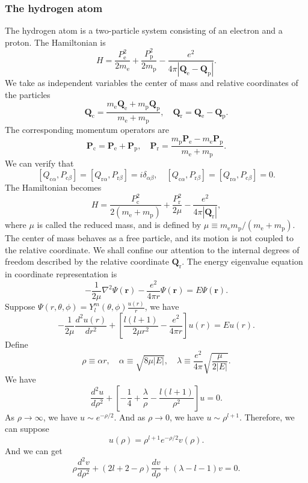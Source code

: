 \subsubsection{The hydrogen atom}
The hydrogen atom is a two-particle system consisting of an electron and a proton. The Hamiltonian is
\[H = \frac{P_{\mathrm{e}}^2}{2m_{\mathrm{e}}} + \frac{P_{\mathrm{p}}^2}{2m_{\mathrm{p}}} - \frac{e^2}{4\pi|\bm{Q}_{\mathrm{e}}-\bm{Q}_{\mathrm{p}}|}.\]
We take as independent variables the center of mass and relative coordinates of the particles
\[\bm{Q}_{\mathrm{c}} = \frac{m_{\mathrm{e}}\bm{Q}_{\mathrm{e}} + m_{\mathrm{p}}\bm{Q}_{\mathrm{p}}}{m_{\mathrm{e}}+m_{\mathrm{p}}} , \quad \bm{Q}_{\mathrm{r}} = \bm{Q}_{\mathrm{e}}-\bm{Q}_{\mathrm{p}}.\]
The corresponding momentum operators are
\[\bm{P}_{\mathrm{c}} = \bm{P}_{\mathrm{e}} + \bm{P}_{\mathrm{p}} , \quad \bm{P}_{\mathrm{r}} = \frac{m_{\mathrm{p}}\bm{P}_{\mathrm{e}}-m_{\mathrm{e}}\bm{P}_{\mathrm{p}}}{m_{\mathrm{e}} + m_{\mathrm{p}}}.\]
We can verify that
\[[Q_{\mathrm{c}\alpha},P_{\mathrm{c}\beta}] = [Q_{\mathrm{r}\alpha},P_{\mathrm{r}\beta}] = i\delta_{\alpha\beta} , \quad [Q_{\mathrm{c}\alpha},P_{\mathrm{r}\beta}] = [Q_{\mathrm{r}\alpha},P_{\mathrm{c}\beta}] = 0.\]
The Hamiltonian becomes
\[H = \frac{P_{\mathrm{c}}^2}{2(m_{\mathrm{e}}+m_{\mathrm{p}})} + \frac{P_{\mathrm{r}}^2}{2\mu} - \frac{e^2}{4\pi|\bm{Q}_{\mathrm{r}}|},\]
where $\mu$ is called the reduced mass, and is defined by $\mu \equiv {m_{\mathrm{e}}m_{\mathrm{p}}}/({m_{\mathrm{e}}+m_{\mathrm{p}}})$.
The center of mass behaves as a free particle, and its
motion is not coupled to the relative coordinate. We shall confine our attention to the internal degrees of freedom described by the relative coordinate $\bm{Q}_{\mathrm{r}}$. The energy eigenvalue equation in coordinate representation is
\[-\frac{1}{2\mu}\nabla^2 \Psi(\bm{r})  -\frac{e^2}{4\pi r} \Psi(\bm{r}) = E\Psi(\bm{r}).\]
Suppose $\Psi(r,\theta,\phi) = Y_l^m(\theta,\phi) \frac{u(r)}{r}$, we have
\[-\frac{1}{2\mu} \frac{d^2 u(r)}{dr^2} + \left[ \frac{l(l+1)}{2\mu r^2} - \frac{e^2}{4\pi r}\right]u(r) = Eu(r).\]
Define
\[\rho \equiv \alpha r , \quad \alpha \equiv \sqrt{8\mu|E|} , \quad \lambda \equiv \frac{e^2}{4\pi} \sqrt{\frac{\mu}{2|E|}}.\]
We have
\[\frac{d^2 u}{d\rho^2} + \left[ -\frac{1}{4} + \frac{\lambda}{\rho} - \frac{l(l+1)}{\rho^2} \right] u = 0.\]
As $\rho \to \infty$, we have $u \sim e^{-\rho/2}$. And as $\rho \to 0$, we have $u \sim \rho^{l+1}$. Therefore, we can suppose
\[u(\rho) = \rho^{l+1} e^{-\rho/2} v(\rho).\]
And we can get
\[\rho \frac{d^2 v}{d\rho^2} + (2l+2-\rho)\frac{dv}{d\rho} + (\lambda-l-1)v = 0.\]

